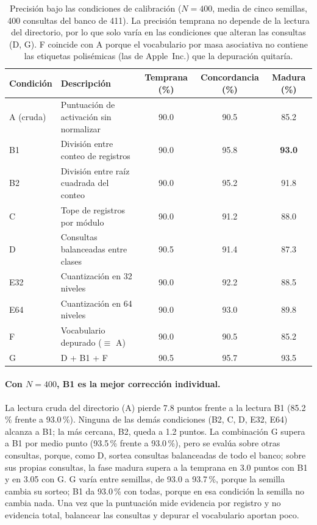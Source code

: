 \begin{table}[H]
    \centering
    \caption[Precisión bajo las condiciones de calibración]{Precisión bajo las condiciones de calibración
    ($N = 400$, media de cinco semillas, 400 consultas del banco de 411).
    La precisión temprana no depende de la lectura del directorio, por lo que solo
    varía en las condiciones que alteran las consultas (D, G).
    F coincide con A porque el vocabulario por masa asociativa no contiene las etiquetas
    polisémicas (las de Apple~Inc.) que la depuración quitaría.}
    \label{tab:calibracion}
    \footnotesize
    \setlength{\tabcolsep}{3pt}
    \begin{tabular}{llccc}
        \toprule
        Condición & Descripción & Temprana (\%) & Concordancia (\%) & Madura (\%) \\
        \midrule
        A (cruda)  & Puntuación de activación sin normalizar        & 90.0 & 90.5 & 85.2 \\
        B1         & División entre conteo de registros             & 90.0 & 95.8 & \textbf{93.0} \\
        B2         & División entre raíz cuadrada del conteo        & 90.0 & 95.2 & 91.8 \\
        C          & Tope de registros por módulo                   & 90.0 & 91.2 & 88.0 \\
        D          & Consultas balanceadas entre clases             & 90.5 & 91.4 & 87.3 \\
        E32        & Cuantización en 32 niveles                     & 90.0 & 92.2 & 88.5 \\
        E64        & Cuantización en 64 niveles                     & 90.0 & 93.0 & 89.8 \\
        F          & Vocabulario depurado ($\equiv$ A)              & 90.0 & 90.5 & 85.2 \\
        G          & D + B1 + F                                     & 90.5 & 95.7 & 93.5 \\
        \bottomrule
    \end{tabular}
\end{table}

\paragraph{Con $N = 400$, B1 es la mejor corrección individual.}
La lectura cruda del directorio (A) pierde 7.8 puntos frente a la lectura B1 (85.2\,\%
frente a 93.0\,\%).
Ninguna de las demás condiciones (B2, C, D, E32, E64) alcanza a B1; la más cercana, B2,
queda a 1.2 puntos.
La combinación G supera a B1 por medio punto (93.5\,\% frente a 93.0\,\%), pero se
evalúa sobre otras consultas, porque, como D, sortea consultas balanceadas de todo el
banco; sobre sus propias consultas, la fase madura supera a la temprana en 3.0 puntos
con B1 y en 3.05 con G.
G varía entre semillas, de 93.0 a 93.7\,\%, porque la semilla cambia su sorteo; B1 da
93.0\,\% con todas, porque en esa condición la semilla no cambia nada.
Una vez que la puntuación mide evidencia por registro y no evidencia total, balancear las
consultas y depurar el vocabulario aportan poco.

